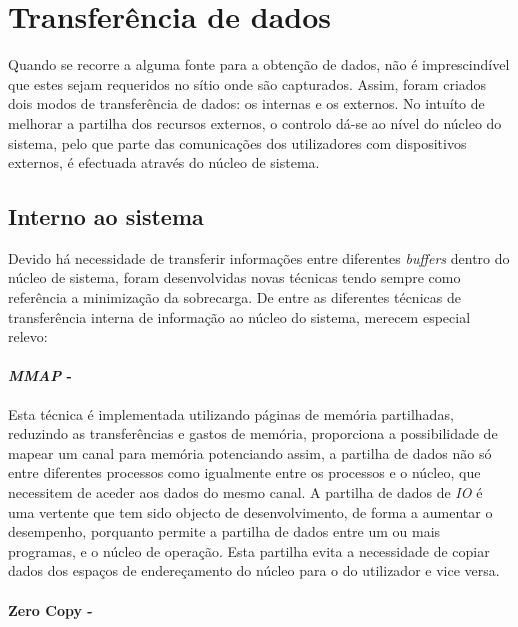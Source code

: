 \section{Transferência de dados}
\label{sect:kernel_user_comm}

Quando se recorre a alguma fonte para a obtenção de dados, não é imprescindível que estes sejam requeridos no sítio onde são capturados.
Assim, foram criados dois modos de transferência de dados: os internas e os externos.
No intuíto de melhorar a partilha dos recursos externos, o controlo dá-se ao nível do núcleo do sistema, pelo que parte das comunicações dos utilizadores com dispositivos externos, é efectuada através do núcleo de sistema.

\subsection{Interno ao sistema}

Devido há necessidade de transferir informações entre diferentes \textit{buffers} dentro do núcleo de sistema, foram desenvolvidas novas técnicas tendo sempre como referência a minimização da sobrecarga.
De entre as diferentes técnicas de transferência interna de informação ao núcleo do sistema, merecem especial relevo:

\paragraph*{\textit{MMAP} - }

Esta técnica é implementada utilizando páginas de memória partilhadas, reduzindo as transferências e gastos de memória, proporciona a possibilidade de mapear um canal para memória potenciando assim, a partilha de dados não só entre diferentes processos como igualmente entre os processos e o núcleo, que necessitem de aceder aos dados do mesmo canal.
A partilha de dados de \textit{IO} é uma vertente que tem sido objecto de desenvolvimento, de forma a aumentar o desempenho, porquanto permite a partilha de dados entre um ou mais programas, e o núcleo de operação.
Esta partilha evita a necessidade de copiar dados dos espaços de endereçamento do núcleo para o do utilizador e vice versa.

\paragraph*{Zero Copy - }

